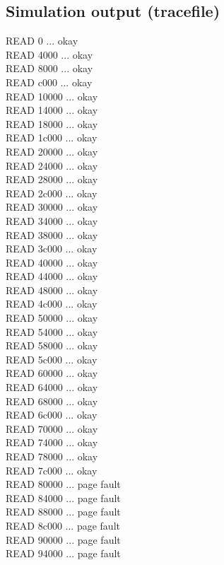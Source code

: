 \documentclass{article}
\begin{document}
\subsection{Simulation output (tracefile)}
\ttfamily
\small
READ 0 ... okay\\
READ 4000 ... okay\\
READ 8000 ... okay\\
READ c000 ... okay\\
READ 10000 ... okay\\
READ 14000 ... okay\\
READ 18000 ... okay\\
READ 1c000 ... okay\\
READ 20000 ... okay\\
READ 24000 ... okay\\
READ 28000 ... okay\\
READ 2c000 ... okay\\
READ 30000 ... okay\\
READ 34000 ... okay\\
READ 38000 ... okay\\
READ 3c000 ... okay\\
READ 40000 ... okay\\
READ 44000 ... okay\\
READ 48000 ... okay\\
READ 4c000 ... okay\\
READ 50000 ... okay\\
READ 54000 ... okay\\
READ 58000 ... okay\\
READ 5c000 ... okay\\
READ 60000 ... okay\\
READ 64000 ... okay\\
READ 68000 ... okay\\
READ 6c000 ... okay\\
READ 70000 ... okay\\
READ 74000 ... okay\\
READ 78000 ... okay\\
READ 7c000 ... okay\\
READ 80000 ... page fault\\
READ 84000 ... page fault\\
READ 88000 ... page fault\\
READ 8c000 ... page fault\\
READ 90000 ... page fault\\
READ 94000 ... page fault\\
\end{document}

